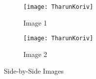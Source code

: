 \documentclass{article}
\begin{document}
	\begin{figure}[htpb]
		\centering
		\begin{subfigure}[b]{0.45\textwidth}
			\centering
			\texttt{[image: TharunKoriv]}
			\caption{Image 1}
			\label{fig:image1}
		\end{subfigure}
	\hfill
		\begin{subfigure}[b]{0.45\textwidth}
			\centering
			\texttt{[image: TharunKoriv]}
			\caption{Image 2}
			\label{fig:image2}
		\end{subfigure}
	\caption{Side-by-Side Images}
	\end{figure}
\end{document}
